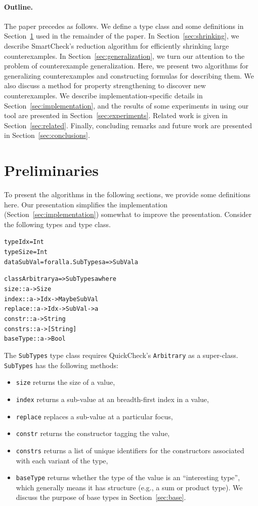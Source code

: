 \documentclass[10pt]{sigplanconf}
\newenvironment{code}{\begin{alltt}}{\end{alltt}}
\newcommand{\ttp}[1]{\texttt{#1}}
\begin{document}
\paragraph{Outline.}
The paper precedes as follows.  We define a type class and some definitions in
Section~\ref{sec:preliminaries} used in the remainder of the paper.  In
Section~\ref{sec:shrinking}, we describe SmartCheck's reduction algorithm for
efficiently shrinking large counterexamples.  In
Section~\ref{sec:generalization}, we turn our attention to the problem of
counterexample generalization.  Here, we present two algorithms for generalizing
counterexamples and constructing formulas for describing them.  We also discuss
a method for property strengthening to discover new counterexamples.  We
describe implementation-specific details in Section~\ref{sec:implementation},
and the results of some experiments in using our tool are presented in
Section~\ref{sec:experiments}.  Related work is given in
Section~\ref{sec:related}.  Finally, concluding remarks and future work are
presented in Section~\ref{sec:conclusions}.


\section{Preliminaries}\label{sec:preliminaries}



To present the algorithms in the following sections, we provide some definitions
here.  Our presentation simplifies the implementation
(Section~\ref{sec:implementation}) somewhat to improve the presentation.
Consider the following types and type class.
%
\begin{code}
type Idx    = Int
type Size   = Int
data SubVal = forall a. SubTypes a => SubVal a

class Arbitrary a => SubTypes a where
  size     :: a -> Size
  index    :: a -> Idx -> Maybe SubVal
  replace  :: a -> Idx -> SubVal -> a
  constr   :: a -> String
  constrs  :: a -> [String]
  baseType :: a -> Bool
\end{code}
%
\noindent
The \ttp{SubTypes} type class requires QuickCheck's \ttp{Arbitrary} as a
super-class.  \ttp{SubTypes} has the following methods:
\begin{itemize}
\item \ttp{size} returns the size of a value,
\item \ttp{index} returns a sub-value at an breadth-first index in a value,
\item \ttp{replace} replaces a sub-value at a particular focus,
\item \ttp{constr} returns the constructor tagging the value,
\item \ttp{constrs} returns a list of unique identifiers for the constructors
  associated with each variant of the type,
\item \ttp{baseType} returns whether the type of the value is an ``interesting
  type'', which generally means it has structure (e.g., a sum or product type).
  We discuss the purpose of base types in Section~\ref{sec:base}.
\end{itemize}
\end{document}
